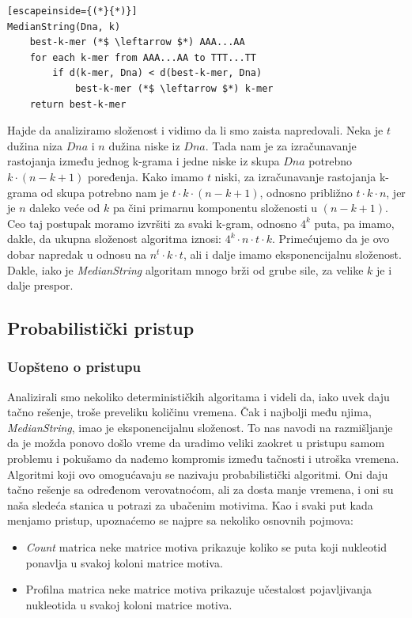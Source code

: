 \begin{lstlisting}[escapeinside={(*}{*)}]
MedianString(Dna, k)
	best-k-mer (*$ \leftarrow $*) AAA...AA
    for each k-mer from AAA...AA to TTT...TT
        if d(k-mer, Dna) < d(best-k-mer, Dna)
            best-k-mer (*$ \leftarrow $*) k-mer
    return best-k-mer
\end{lstlisting}

Hajde da analiziramo složenost i vidimo da li smo zaista napredovali. Neka je $t$ dužina niza $Dna$ i $n$ dužina niske iz $Dna$. Tada nam je za izračunavanje rastojanja između jednog k-grama i jedne niske iz skupa $Dna$ potrebno $k \cdot (n-k+1)$ poređenja. Kako imamo $t$ niski, za izračunavanje rastojanja k-grama od skupa potrebno nam je $t \cdot k \cdot (n-k+1)$, odnosno približno $t \cdot k \cdot n$, jer je $n$ daleko veće od $k$ pa čini primarnu komponentu složenosti u $(n-k+1)$. Ceo taj postupak moramo izvršiti za svaki k-gram, odnosno $4^k$ puta, pa imamo, dakle, da ukupna složenost algoritma iznosi: $4^k \cdot n \cdot t \cdot k$. Primećujemo da je ovo dobar napredak u odnosu na $n^t \cdot k \cdot t$, ali i dalje imamo eksponencijalnu složenost. Dakle, iako je \textit{MedianString} algoritam mnogo brži od grube sile, za velike $k$ je i dalje prespor. 

\subsection{Probabilistički pristup}

\subsubsection{Uopšteno o pristupu}

Analizirali smo nekoliko determinističkih algoritama i videli da, iako uvek daju tačno rešenje, troše preveliku količinu vremena. Čak i najbolji među njima, \textit{MedianString}, imao je eksponencijalnu složenost. To nas navodi na razmišljanje da je možda ponovo došlo vreme da uradimo veliki zaokret u pristupu samom problemu i pokušamo da nađemo kompromis između tačnosti i utroška vremena. Algoritmi koji ovo omogućavaju se nazivaju probabilistički algoritmi. Oni daju tačno rešenje sa određenom verovatnoćom, ali za dosta manje vremena, i oni su naša sledeća stanica u potrazi za ubačenim motivima. Kao i svaki put kada menjamo pristup, upoznaćemo se najpre sa nekoliko osnovnih pojmova:
 
\begin{itemize}
    \item \textit{Count} matrica neke matrice motiva prikazuje koliko se puta koji nukleotid ponavlja u svakoj koloni matrice motiva.
    \item Profilna matrica neke matrice motiva prikazuje učestalost pojavljivanja nukleotida u svakoj koloni matrice motiva.
\end{itemize}

